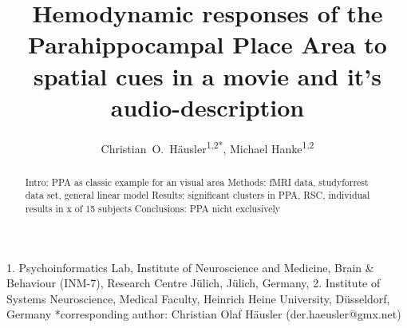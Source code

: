 \documentclass[english]{article}
\begin{document}
\title{Hemodynamic responses of the Parahippocampal Place Area to spatial cues in a movie and it's audio-description}

\author{Christian~O.~Häusler\textsuperscript{1,2{*}}, Michael Hanke\textsuperscript{1,2}}

\maketitle
\thispagestyle{fancy}

1. Psychoinformatics Lab, Institute of Neuroscience and Medicine, Brain \& Behaviour (INM-7), Research Centre Jülich, Jülich, Germany,
2. Institute of Systems Neuroscience, Medical Faculty, Heinrich Heine University, Düsseldorf, Germany
{*}corresponding author: Christian Olaf Häusler (der.haeusler@gmx.net)

\begin{abstract}
Intro: PPA as classic example for an visual area
Methods: fMRI data, studyforrest data set, general linear model
Results: significant clusters in PPA, RSC, individual results in x of 15 subjects
Conclusions: PPA nicht exclusively
\end{abstract}
\end{document}
